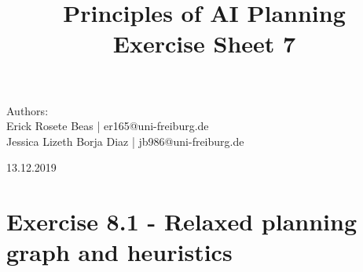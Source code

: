 \documentclass[12pt,a4paper]{article}
\title{\textbf{Principles of AI Planning
		\\{\Large Exercise Sheet 7}}}
\begin{document}
\begin{flushleft}
	Authors:\\
	Erick Rosete Beas | er165@uni-freiburg.de\\
	Jessica Lizeth Borja Diaz | jb986@uni-freiburg.de\\
\end{flushleft}
{\let\newpage\relax\maketitle}
\begin{center} 
	\large 13.12.2019 
\end{center}


\section*{Exercise 8.1 - Relaxed planning graph and heuristics}
\end{document}

